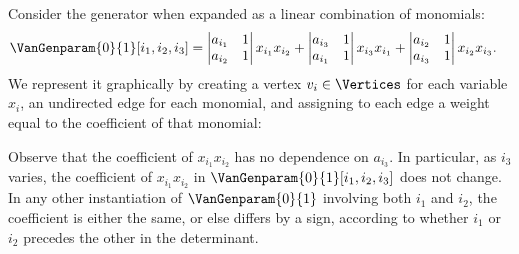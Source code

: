 \documentclass{toc}
\begin{document}
Consider the generator when expanded as a linear combination of monomials:
\begin{align*}
  \VanGenparam{0}{1}[i_1, i_2, i_3]
  &=
  \begin{vmatrix}
    a_{i_1} & 1 \\
    a_{i_2} & 1
  \end{vmatrix}x_{i_1} x_{i_2}
  +
  \begin{vmatrix}
    a_{i_3} & 1 \\
    a_{i_1} & 1
  \end{vmatrix}x_{i_3} x_{i_1}
  +
  \begin{vmatrix}
    a_{i_2} & 1 \\
    a_{i_3} & 1
  \end{vmatrix}x_{i_2} x_{i_3}.
\end{align*}
We represent it graphically by creating a vertex $v_i \in \Vertices$ for each variable $x_i$, an
undirected edge for each monomial, and assigning to each edge a weight
equal to the coefficient of that monomial:
\begin{center}
\end{center}
Observe that the coefficient of \(x_{i_1}x_{i_2}\) has no dependence on
\(a_{i_3}\).
In particular, as \(i_3\) varies,
the coefficient of \(x_{i_1}x_{i_2}\) in \(\VanGenparam{0}{1}[i_1, i_2, i_3]\)
does not change.
In any other instantiation of \(\VanGenparam{0}{1}\) involving both
\(i_1\) and \(i_2\), the coefficient is either the same, or else differs by
a sign,
according to whether \(i_1\) or \(i_2\) precedes the other in the determinant.
\end{document}
